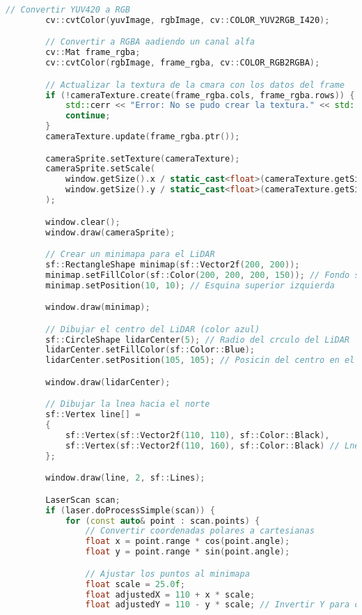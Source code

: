\begin{lstlisting}[language={C++}, caption={Primer ajuste de c\'odigo}, label={Script}]
        // Convertir YUV420 a RGB
        cv::cvtColor(yuvImage, rgbImage, cv::COLOR_YUV2RGB_I420);

        // Convertir a RGBA aadiendo un canal alfa
        cv::Mat frame_rgba;
        cv::cvtColor(rgbImage, frame_rgba, cv::COLOR_RGB2RGBA);

        // Actualizar la textura de la cmara con los datos del frame
        if (!cameraTexture.create(frame_rgba.cols, frame_rgba.rows)) {
            std::cerr << "Error: No se pudo crear la textura." << std::endl;
            continue;
        }
        cameraTexture.update(frame_rgba.ptr());

        cameraSprite.setTexture(cameraTexture);
        cameraSprite.setScale(
            window.getSize().x / static_cast<float>(cameraTexture.getSize().x),
            window.getSize().y / static_cast<float>(cameraTexture.getSize().y)
        );

        window.clear();
        window.draw(cameraSprite);

        // Crear un minimapa para el LiDAR
        sf::RectangleShape minimap(sf::Vector2f(200, 200));
        minimap.setFillColor(sf::Color(200, 200, 200, 150)); // Fondo semitransparente
        minimap.setPosition(10, 10); // Esquina superior izquierda

        window.draw(minimap);

        // Dibujar el centro del LiDAR (color azul)
        sf::CircleShape lidarCenter(5); // Radio del crculo del LiDAR
        lidarCenter.setFillColor(sf::Color::Blue);
        lidarCenter.setPosition(105, 105); // Posicin del centro en el minimapa

        window.draw(lidarCenter);

        // Dibujar la lnea hacia el norte
        sf::Vertex line[] =
        {
            sf::Vertex(sf::Vector2f(110, 110), sf::Color::Black),
            sf::Vertex(sf::Vector2f(110, 160), sf::Color::Black) // Lnea hacia arriba (norte)
        };

        window.draw(line, 2, sf::Lines);

        LaserScan scan;
        if (laser.doProcessSimple(scan)) {
            for (const auto& point : scan.points) {
                // Convertir coordenadas polares a cartesianas
                float x = point.range * cos(point.angle);
                float y = point.range * sin(point.angle);

                // Ajustar los puntos al minimapa
                float scale = 25.0f;
                float adjustedX = 110 + x * scale;
                float adjustedY = 110 - y * scale; // Invertir Y para coordinar con la pantalla


\end{lstlisting}
